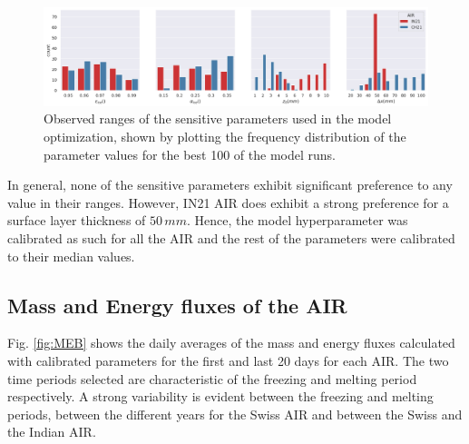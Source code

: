 \documentclass[utf8]{frontiersSCNS} %
\begin{document}
\begin{figure}
	\begin{center}
		\includegraphics[width=\linewidth]{Figures/param_hist.jpg}
	\end{center}
	\caption{Observed ranges of the sensitive parameters used in the model optimization, shown by
		plotting the frequency distribution of the parameter values for the best 100 of the model runs. }
	\label{fig:param_hist} \end{figure}

In general, none of the sensitive parameters exhibit significant preference to any value in their ranges. However, IN21
AIR does exhibit a strong preference for a surface layer thickness of $50\,mm$. Hence, the model hyperparameter was
calibrated as such for all the AIR and the rest of the parameters were calibrated to their median values.

\subsection{Mass and Energy fluxes of the AIR}

Fig. \ref{fig:MEB} shows the daily averages of the mass and energy fluxes calculated with calibrated parameters for the
first and last 20 days for each AIR. The two time periods selected are characteristic of the freezing and melting period
respectively. A strong variability is evident between the freezing and melting periods, between the different years for
the Swiss AIR and between the Swiss and the Indian AIR.
\end{document}
